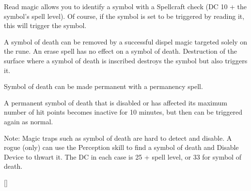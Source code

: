{Read magic allows you to identify a symbol with a Spellcraft check (DC 10 + the symbol's spell level). Of course, if the symbol is set to be triggered by reading it, this will trigger the symbol.

A symbol of death can be removed by a successful dispel magic targeted solely on the rune. An erase spell has no effect on a symbol of death. Destruction of the surface where a symbol of death is inscribed destroys the symbol but also triggers it.

Symbol of death can be made permanent with a permanency spell.

A permanent symbol of death that is disabled or has affected its maximum number of hit points becomes inactive for 10 minutes, but then can be triggered again as normal.

Note: Magic traps such as symbol of death are hard to detect and disable. A rogue (only) can use the Perception skill to find a symbol of death and Disable Device to thwart it. The DC in each case is 25 + spell level, or 33 for symbol of death.}
        
[]
    
